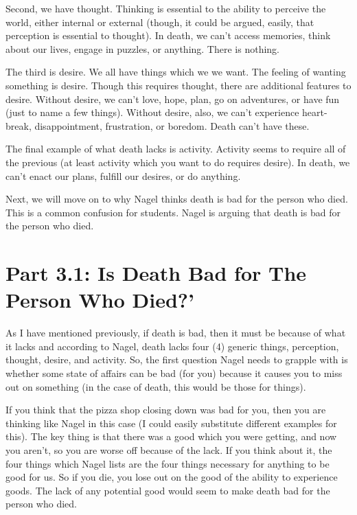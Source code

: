 Second, we have thought. Thinking is essential to the ability to perceive the world, either internal or external (though, it could be argued, easily, that perception is essential to thought). In death, we can't access memories, think about our lives, engage in puzzles, or anything. There is nothing.

The third is desire. We all have things which we we want. The feeling of wanting something is desire. Though this requires thought, there are additional features to desire. Without desire, we can't love, hope, plan, go on adventures, or have fun (just to name a few things). Without desire, also, we can't experience heart-break, disappointment, frustration, or boredom. Death can't have these.

The final example of what death lacks is activity. Activity seems to require all of the previous (at least activity which you want to do requires desire). In death, we can't enact our plans, fulfill our desires, or do anything.

Next, we will move on to why Nagel thinks death is bad for the person who died. This is a common confusion for students. Nagel is arguing that death is bad for the person who died. 

\section{Part 3.1: Is Death Bad for The Person Who Died?'}

As I have mentioned previously, if death is bad, then it must be because of what it lacks and according to Nagel, death lacks four (4) generic things, perception, thought, desire, and activity. So, the first question Nagel needs to grapple with is whether some state of affairs can be bad (for you) because it causes you to miss out on something (in the case of death, this would be those for things).


If you think that the pizza shop closing down was bad for you, then you are thinking like Nagel in this case (I could easily substitute different examples for this). The key thing is that there was a good which you were getting, and now you aren't, so you are worse off because of the lack. If you think about it, the four things which Nagel lists are the four things necessary for anything to be good for us. So if you die, you lose out on the good of the ability to experience goods. The lack of any potential good would seem to make death bad for the person who died. 

